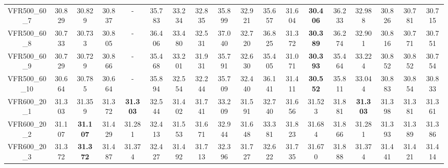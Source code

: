 \begin{tabular}{cc|ccc|ccccccccccccc}
VFR500\_60\_7      & 30.829           & 30.829           & 30.837           & -                & 35.783           & 33.234           & 32.835           & 35.899           & 32.921           & 35.657           & 31.604           & {\bf 30.406}     & 36.233           & 32.988           & 30.826           & 30.781           & 30.715          \\ 
VFR500\_60\_8      & 30.733           & 30.733           & 30.805           & -                & 36.406           & 33.480           & 32.531           & 37.040           & 32.720           & 36.825           & 31.372           & {\bf 30.389}     & 36.274           & 32.901           & 30.816           & 30.771           & 30.751          \\ 
VFR500\_60\_9      & 30.729           & 30.729           & 30.866           & -                & 35.468           & 33.201           & 31.931           & 35.791           & 32.630           & 35.405           & 31.071           & {\bf 30.393}     & 35.464           & 33.224           & 30.852           & 30.852           & 30.754          \\ 
VFR500\_60\_10     & 30.664           & 30.785           & 30.664           & -                & 35.894           & 32.554           & 32.244           & 35.709           & 32.440           & 36.141           & 31.411           & {\bf 30.552}     & 35.811           & 33.044           & 30.883           & 30.854           & 30.833          \\ 
VFR600\_20\_1      & 31.303           & 31.359           & 31.372           & {\bf 31.303}     & 32.544           & 31.402           & 31.741           & 33.209           & 31.591           & 32.740           & 31.656           & 31.523           & 31.881           & {\bf 31.303}     & 31.398           & 31.381           & 31.361          \\ 
VFR600\_20\_2      & 31.107           & {\bf 31.107}     & 31.429           & 31.281           & 32.413           & 31.553           & 31.671           & 32.944           & 31.648           & 33.381           & 31.823           & 31.684           & 31.866           & 31.281           & 31.393           & 31.389           & 31.386          \\ 
VFR600\_20\_3      & 31.372           & {\bf 31.372}     & 31.487           & 31.374           & 32.427           & 31.492           & 31.713           & 32.396           & 31.727           & 32.622           & 31.735           & 31.670           & 31.888           & 31.374           & 31.441           & 31.421           & 31.414          \\ 

\end{tabular}
